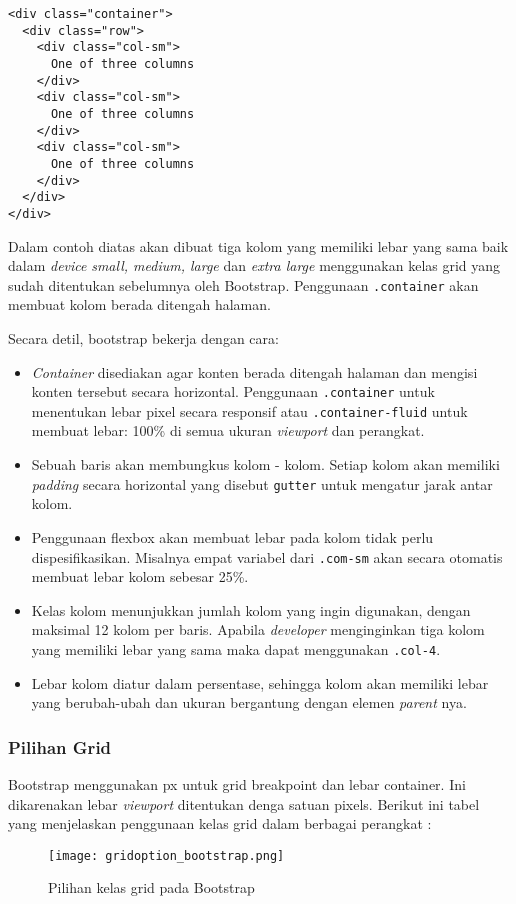 \begin{lstlisting}[frame=single] 
<div class="container">
  <div class="row">
    <div class="col-sm">
      One of three columns
    </div>
    <div class="col-sm">
      One of three columns
    </div>
    <div class="col-sm">
      One of three columns
    </div>
  </div>
</div>
\end{lstlisting}
Dalam contoh diatas akan dibuat tiga kolom yang memiliki lebar yang sama baik dalam \textit{device} \textit{small, medium, large} dan \textit{extra large} menggunakan kelas grid yang sudah ditentukan sebelumnya oleh Bootstrap. Penggunaan \verb|.container| akan membuat kolom berada ditengah halaman.

Secara detil, bootstrap bekerja dengan cara:
\begin{itemize}
\item \textit{Container} disediakan agar konten berada ditengah halaman dan mengisi konten tersebut secara horizontal. Penggunaan \verb|.container| untuk menentukan lebar pixel secara responsif atau \verb|.container-fluid| untuk membuat lebar: 100\%  di semua ukuran \textit{viewport} dan perangkat.
\item Sebuah baris akan membungkus kolom - kolom. Setiap kolom akan memiliki \textit{padding} secara horizontal yang disebut \verb|gutter| untuk mengatur jarak antar kolom.
\item Penggunaan flexbox akan membuat lebar pada kolom tidak perlu dispesifikasikan. Misalnya empat variabel dari \verb|.com-sm| akan secara otomatis membuat lebar kolom sebesar 25\%.
\item Kelas kolom menunjukkan jumlah kolom yang ingin digunakan, dengan maksimal 12 kolom per baris. Apabila \textit{developer} menginginkan tiga kolom yang memiliki lebar yang sama maka dapat menggunakan \texttt{.col-4}.
\item Lebar kolom diatur dalam persentase, sehingga kolom akan memiliki lebar yang berubah-ubah dan ukuran bergantung dengan elemen \textit{parent} nya.
\end{itemize}
\subsubsection{Pilihan Grid}
Bootstrap menggunakan px untuk grid breakpoint dan lebar container. Ini dikarenakan lebar \textit{viewport} ditentukan denga satuan pixels.
Berikut ini tabel yang menjelaskan penggunaan kelas grid dalam berbagai perangkat :
\begin{figure} [H]
	\centering  
	\texttt{[image: gridoption\_bootstrap.png]}  
	\caption{Pilihan kelas grid pada Bootstrap} 
\end{figure}

